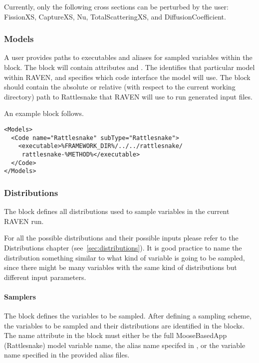 \nb Currently, only the following cross sections can be perturbed by the user: FissionXS, CaptureXS, Nu, TotalScatteringXS,
and DiffusionCoefficient.

\subsubsection{Models}
A user provides paths to executables and aliases for sampled variables within the
 block.  The  block will contain attributes  and
. The  identifies that particular  model within RAVEN, and
 specifies which code interface the model will use. The 
block should contain the absolute or relative (with respect to the current working
directory) path to Rattlesnake that RAVEN will use to run generated input
files.

An example  block follows.

\begin{lstlisting}[style=XML]
<Models>
  <Code name="Rattlesnake" subType="Rattlesnake">
    <executable>%FRAMEWORK_DIR%/../../rattlesnake/
     rattlesnake-%METHOD%</executable>
  </Code>
</Models>
\end{lstlisting}

\subsubsection{Distributions}
The  block defines all distributions used to
sample variables in the current RAVEN run.

For all the possible distributions and their possible inputs please
refer to the Distributions chapter (see~\ref{sec:distributions}).
%
It is good practice to name the distribution something similar to what kind of
variable is going to be sampled, since there might be many variables with the
same kind of distributions but different input parameters.

\paragraph{Samplers}
The  block defines the variables to be sampled.
After defining a sampling scheme, the variables to be sampled and
their distributions are identified in the  blocks.
The name attribute in the  block must either be the
full MooseBasedApp (Rattlesnake) model variable name, the alias name specifed in
, or the variable name specified in the provided alias files.

